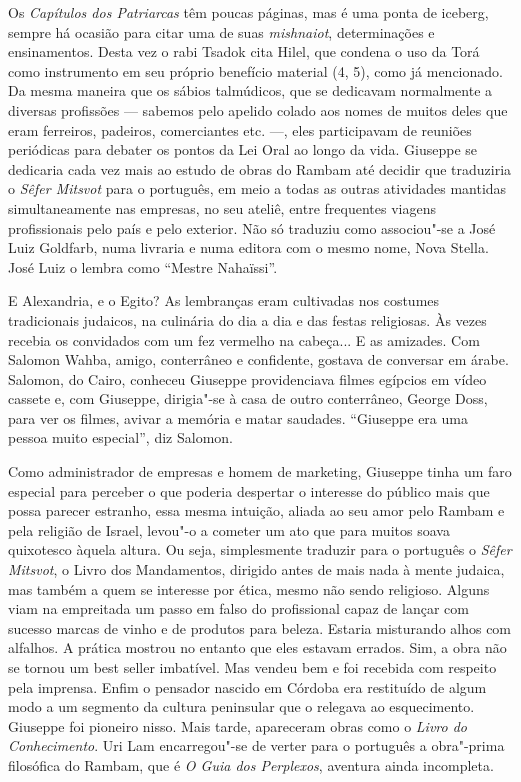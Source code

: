 Os \emph{Capítulos dos Patriarcas} têm poucas páginas, mas é uma ponta
de iceberg, sempre há ocasião para citar uma de suas \emph{mishnaiot},
determinações e ensinamentos. Desta vez o rabi Tsadok cita Hilel, que
condena o uso da Torá como instrumento em seu próprio benefício material
(4, 5), como já mencionado. Da mesma maneira que os sábios talmúdicos,
que se dedicavam normalmente a diversas profissões --- sabemos pelo
apelido colado aos nomes de muitos deles que eram ferreiros, padeiros,
comerciantes etc. ---, eles participavam de reuniões periódicas para debater
os pontos da Lei Oral ao longo da vida. Giuseppe se dedicaria cada vez
mais ao estudo de obras do Rambam até decidir que traduziria o
\emph{Sêfer Mitsvot} para o português, em meio a todas as outras
atividades mantidas simultaneamente nas empresas, no seu ateliê, entre
frequentes viagens profissionais pelo país e pelo exterior. Não só
traduziu como associou"-se a José Luiz Goldfarb, numa livraria e numa
editora com o mesmo nome, Nova Stella. José Luiz o lembra como ``Mestre
Nahaïssi''.

E Alexandria, e o Egito? As lembranças eram cultivadas nos costumes
tradicionais judaicos, na culinária do dia a dia e das festas
religiosas. Às vezes recebia os convidados com um fez vermelho na
cabeça... E as amizades. Com Salomon Wahba, amigo, conterrâneo e
confidente, gostava de conversar em árabe. Salomon, do Cairo, conheceu
Giuseppe providenciava filmes egípcios em vídeo cassete e, com Giuseppe,
dirigia"-se à casa de outro conterrâneo, George Doss, para ver os filmes,
avivar a memória e matar saudades. ``Giuseppe era uma pessoa muito
especial'', diz Salomon.

\asterisc

Como administrador de empresas e homem de marketing, Giuseppe tinha um
faro especial para perceber o que poderia despertar o interesse do
público mais que possa parecer estranho, essa mesma intuição, aliada ao
seu amor pelo Rambam e pela religião de Israel, levou"-o a cometer um ato
que para muitos soava quixotesco àquela altura. Ou seja, simplesmente
traduzir para o português o \emph{Sêfer Mitsvot}, o Livro dos
Mandamentos, dirigido antes de mais nada à mente judaica, mas também a
quem se interesse por ética, mesmo não sendo religioso. Alguns viam na
empreitada um passo em falso do profissional capaz de lançar com sucesso
marcas de vinho e de produtos para beleza. Estaria misturando alhos com
alfalhos. A prática mostrou no entanto que eles estavam errados. Sim, a
obra não se tornou um best seller imbatível. Mas vendeu bem e foi
recebida com respeito pela imprensa. Enfim o pensador nascido em
Córdoba era restituído de algum modo a um segmento da cultura
peninsular que o relegava ao esquecimento. Giuseppe foi pioneiro nisso.
Mais tarde, apareceram obras como o \emph{Livro do Conhecimento}. Uri
Lam encarregou"-se de verter para o português a obra"-prima filosófica do
Rambam, que é \emph{O Guia dos Perplexos}, aventura ainda incompleta.

